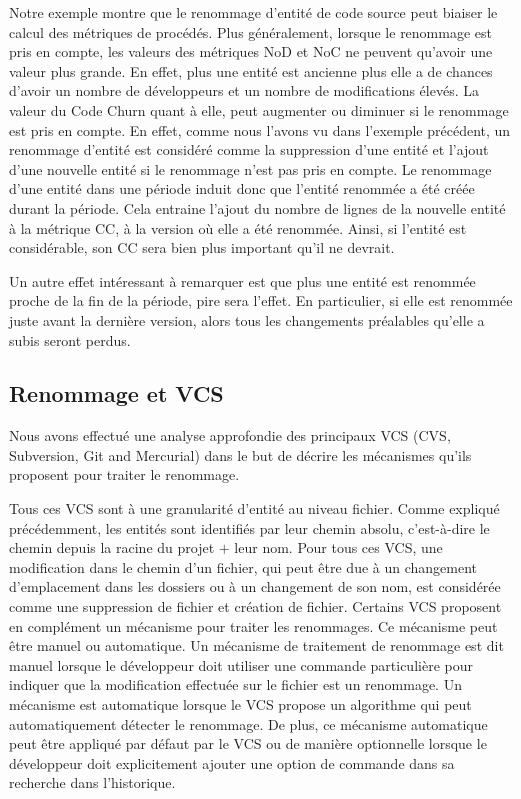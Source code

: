 Notre exemple montre que le renommage d'entité de code source peut biaiser le calcul des métriques de procédés. Plus généralement, lorsque le renommage est pris en compte, les valeurs des métriques NoD et NoC ne peuvent qu'avoir une valeur plus grande. En effet, plus une entité est ancienne plus elle a de chances d'avoir un nombre de développeurs et un nombre de modifications élevés. La valeur du Code Churn quant à elle, peut augmenter ou diminuer si le renommage est pris en compte. En effet, comme nous l'avons vu dans l'exemple précédent, un renommage d'entité est considéré comme la suppression d'une entité et l'ajout d'une nouvelle entité si le renommage n'est pas pris en compte. Le renommage d'une entité dans une période induit donc que l'entité renommée a été créée durant la période. Cela entraine l'ajout du nombre de lignes de la nouvelle entité à la métrique CC, à la version où elle a été renommée. Ainsi, si l'entité est considérable, son CC sera bien plus important qu'il ne devrait. 

Un autre effet intéressant à remarquer est que plus une entité est renommée proche de la fin de la période, pire sera l'effet. En particulier, si elle est renommée juste avant la dernière version, alors tous les changements préalables qu'elle a subis seront perdus.\\

\subsection{Renommage et VCS}
  
Nous avons effectué une analyse approfondie des principaux VCS (CVS, Subversion, Git and Mercurial) dans le but de décrire les mécanismes qu'ils proposent pour traiter le renommage. 

Tous ces VCS sont à une granularité d'entité au niveau fichier. Comme expliqué précédemment, les entités sont identifiés par leur chemin absolu, c'est-à-dire le chemin depuis la racine du projet $+$ leur nom. Pour tous ces VCS, une modification dans le chemin d'un fichier, qui peut être due à un changement d'emplacement dans les dossiers ou à un changement de son nom, est considérée comme une suppression de fichier et création de fichier. Certains VCS proposent en complément un mécanisme pour traiter les renommages. Ce mécanisme peut être manuel ou automatique. Un mécanisme de traitement de renommage est dit manuel lorsque le développeur doit utiliser une commande particulière pour indiquer que la modification effectuée sur le fichier est un renommage. Un mécanisme est automatique lorsque le VCS propose un algorithme qui peut automatiquement détecter le renommage. De plus, ce mécanisme automatique peut être appliqué par défaut par le VCS ou de manière optionnelle lorsque le développeur doit explicitement ajouter une option de commande dans sa recherche dans l'historique.\\
 
